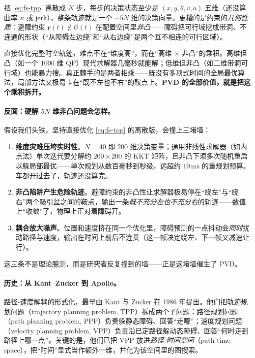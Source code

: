 把 \cref{eq:fs-tpp} 离散成 $N$ 步，每步的决策状态至少是 $(x,y,\theta,v,a)$ 五维（还没算曲率 $\kappa$ 或 jerk），整条轨迹就是一个 $\sim5N$ 维的决策向量。更糟的是约束的\emph{几何性质}：避障约束 $\mathbf{r}(t)\notin\mathcal{O}(t)$ 在配置空间里\emph{非凸}——障碍把可行域挖成带洞、不连通的形状（“从障碍左边绕”和“从右边绕”是两个互不相连的可行区域）。

\begin{insight}
直接优化完整时空轨迹，难点不在“维度高”，而在“高维 $\times$ 非凸”的乘积。高维但凸（如一个 $1000$ 维 QP）现代求解器几毫秒就能解；低维但非凸（如二维带洞可行域）也能暴力搜。真正棘手的是两者相乘——既没有多项式时间的全局最优算法，局部方法又极易卡在“既不左也不右”的鞍点上。\textbf{PVD 的全部价值，就是把这个乘积拆开。}
\end{insight}

\paragraph{反面：硬解 $5N$ 维非凸问题会怎样。}
假设我们头铁，坚持直接优化 \cref{eq:fs-tpp} 的离散版，会撞上三堵墙：
\begin{enumerate}
  \item \textbf{维度灾难压垮实时性}。$N=40$ 即 $200$ 维决策变量；通用非线性求解器（如内点法）单次迭代要分解约 $200\times200$ 的 KKT 矩阵，且非凸下须多次随机重启以躲局部最优——单次规划从数百毫秒到秒级，远超约 $10\,\mathrm{ms}$ 的重规划预算。车都开过去了，轨迹还没算完。
  \item \textbf{非凸陷阱产生危险轨迹}。避障约束的非凸性让求解器极易停在“绕左”与“绕右”两个吸引盆之间的鞍点，输出一条\emph{既不充分左也不充分右}的轨迹——数值上“收敛”了，物理上正对着障碍开。
  \item \textbf{耦合放大噪声}。位置和速度挤在同一个优化里，障碍预测的一点抖动会\emph{同时}扰动路径与速度，输出在时间上前后不连贯（这一帧决定绕左、下一帧又减速让行）。
\end{enumerate}
这三条不是理论臆测，而是研究者反复撞到的墙——正是这堵墙催生了 PVD。

\paragraph{历史：从 Kant--Zucker 到 Apollo。}
路径-速度解耦的形式化，最早由 Kant 与 Zucker 在 1986 年提出\cite{kant1986toward}。他们把轨迹规划问题（trajectory planning problem, TPP）拆成两个子问题：路径规划问题（path planning problem, PPP）负责躲静态障碍、回答“走哪”；速度规划问题（velocity planning problem, VPP）负责沿已定路径躲动态障碍、回答“何时走到路径上哪一点”。关键的是，他们已把 VPP 放进\emph{路径-时间空间}（path-time space），把“时间”显式当作额外一维，并化为该空间里的图搜索。

